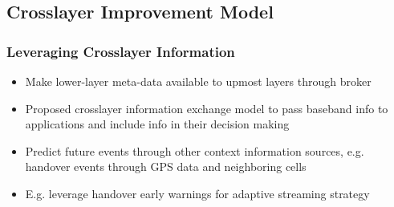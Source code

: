 \documentclass{beamer}
\begin{document}
\subsection{Crosslayer Improvement Model}


\begin{frame}
	\frametitle{Leveraging Crosslayer Information}

	\begin{overlayarea}{\textwidth}{\textheight}
		\begin{itemize}
			\item Make lower-layer meta-data available to upmost layers through broker
			\item Proposed crosslayer information exchange model to pass baseband info to applications and include info in their decision making
			\item Predict future events through other context information sources, e.g. handover events through GPS data and neighboring cells
			\item E.g. leverage handover early warnings for adaptive streaming strategy 
		\end{itemize}
		\vspace{-0.25cm}
	\end{overlayarea}
\end{frame}
\end{document}
